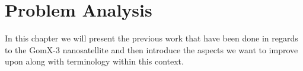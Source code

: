 \chapter{Problem Analysis} \label{cha:problem}
In this chapter we will present the previous work that have been done in regards to the GomX-3 nanosatellite and then introduce the aspects we want to improve upon along with terminology within this context.





